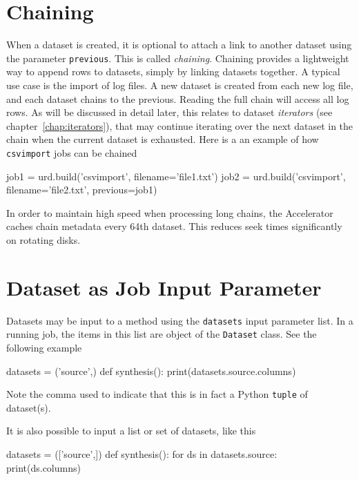 \section{Chaining}
When a dataset is created, it is optional to attach a link to another
dataset using the parameter \texttt{previous}.  This is called
\emph{chaining}.  Chaining provides a lightweight way to append rows
to datasets, simply by linking datasets together.  A typical use case
is the import of log files.  A new dataset is created from each new
log file, and each dataset chains to the previous.  Reading the full
chain will access all log rows.  As will be discussed in detail later,
this relates to dataset \emph{iterators} (see
chapter~\ref{chap:iterators}), that may continue iterating over the
next dataset in the chain when the current dataset is exhausted.  Here
is a an example of how \texttt{csvimport} jobs can be chained
\begin{python}
job1 = urd.build('csvimport', filename='file1.txt')
job2 = urd.build('csvimport', filename='file2.txt', previous=job1)
\end{python}
In order to maintain high speed when processing long chains, the
Accelerator caches chain metadata every 64th dataset.  This reduces
seek times significantly on rotating disks.



\section{Dataset as Job Input Parameter}
Datasets may be input to a method using the \texttt{datasets} input
parameter list.  In a running job, the items in this list are object
of the \texttt{Dataset} class.  See the following example
\begin{python}
datasets = ('source',)
def synthesis():
    print(datasets.source.columns)
\end{python}
Note the comma used to indicate that this is in fact a
Python \texttt{tuple} of dataset(s).

It is also possible to input a list or set of datasets, like this
\begin{python}
datasets = (['source',])
def synthesis():
    for ds in datasets.source:
        print(ds.columns)
\end{python}



